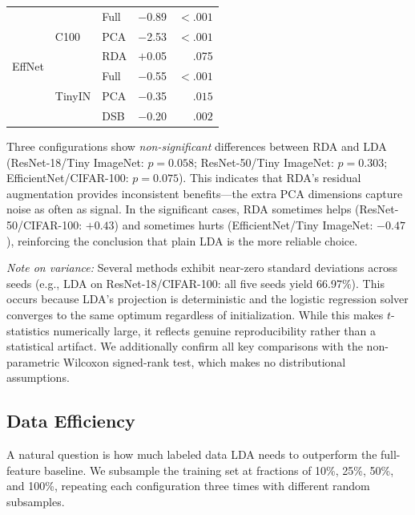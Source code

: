 \begin{table}[t]
\begin{tabular}{@{}l l l r r@{}}
\midrule
\multirow{6}{*}{EffNet}
& \multirow{3}{*}{C100}  & Full  & $-$0.89 & $\mathbf{<.001}$ \\
&                         & PCA   & $-$2.53 & $\mathbf{<.001}$ \\
&                         & RDA   & $+$0.05 & .075           \\
& \multirow{3}{*}{TinyIN} & Full  & $-$0.55 & $\mathbf{<.001}$ \\
&                         & PCA   & $-$0.35 & $\mathbf{.015}$  \\
&                         & DSB   & $-$0.20 & $\mathbf{.002}$  \\
\bottomrule
\end{tabular}
\end{table}

Three configurations show \emph{non-significant} differences between RDA and LDA (ResNet-18/Tiny ImageNet: $p = 0.058$; ResNet-50/Tiny ImageNet: $p = 0.303$; EfficientNet/CIFAR-100: $p = 0.075$). This indicates that RDA's residual augmentation provides inconsistent benefits---the extra PCA dimensions capture noise as often as signal. In the significant cases, RDA sometimes helps (ResNet-50/CIFAR-100: $+0.43$) and sometimes hurts (EfficientNet/Tiny ImageNet: $-0.47$), reinforcing the conclusion that plain LDA is the more reliable choice.

\textit{Note on variance:} Several methods exhibit near-zero standard deviations across seeds (e.g., LDA on ResNet-18/CIFAR-100: all five seeds yield 66.97\%). This occurs because LDA's projection is deterministic and the logistic regression solver converges to the same optimum regardless of initialization. While this makes $t$-statistics numerically large, it reflects genuine reproducibility rather than a statistical artifact. We additionally confirm all key comparisons with the non-parametric Wilcoxon signed-rank test, which makes no distributional assumptions.

\subsection{Data Efficiency}
\label{sec:data_efficiency}

A natural question is how much labeled data LDA needs to outperform the full-feature baseline. We subsample the training set at fractions of 10\%, 25\%, 50\%, and 100\%, repeating each configuration three times with different random subsamples.

